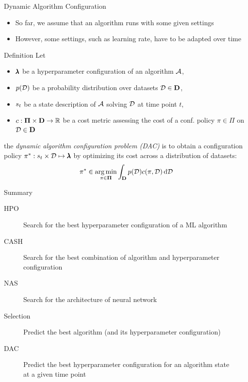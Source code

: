 \begin{frame}[c]{Dynamic Algorithm Configuration}

\begin{itemize}
	\item So far, we assume that an algorithm runs with some given settings
	\pause
	\item However, some settings, such as learning rate, have to be adapted over time
\end{itemize}

\pause

\begin{block}{Definition}
	Let 
	\begin{itemize}
		\item $\pmb{\lambda}$ be a hyperparameter configuration of an algorithm $\mathcal{A}$,
		\pause
		\item $p(\mathcal{D})$ be a probability distribution over datasets $\mathcal{D} \in \mathbf{D}$,
		\pause
		\item $s_t$ be a state description of $\mathcal{A}$ solving $\mathcal{D}$ at time point $t$,
		\pause
		\item $c: \mathbf{\Pi} \times \mathbf{D} \to \mathbb{R}$ be a cost metric assessing the \alert{cost of a conf. policy $\pi \in \Pi$} on $\mathcal{D} \in \mathbf{D}$
	\end{itemize}
	
	\pause
	the \emph{dynamic algorithm configuration problem (DAC)} is to obtain a configuration policy $\pi^* : s_t \times \mathcal{D} \mapsto \pmb{\lambda}$ by optimizing its cost across a distribution of datasets:
	\begin{equation}
	\pi^* \in \operatorname*{arg\,min}_{\pi \in \mathbf{\Pi}} \int_{\mathbf{D}} p(\mathcal{D}) c(\pi, \mathcal{D}) \mathop{}\!\mathrm{d} \mathcal{D} \nonumber
	\end{equation}
\end{block}

\end{frame}
\begin{frame}[c]{Summary}

\begin{description}
	\item[HPO] Search for the best hyperparameter configuration of a ML algorithm
	\item[CASH] Search for the best combination of algorithm and hyperparameter configuration
	\item[NAS] Search for the architecture of neural network
	\bigskip
	\item[Selection] Predict the best algorithm (and its hyperparameter configuration)
	\item[DAC] Predict the best hyperparameter configuration for an algorithm state\\ at a given time point 
\end{description}

\end{frame}

